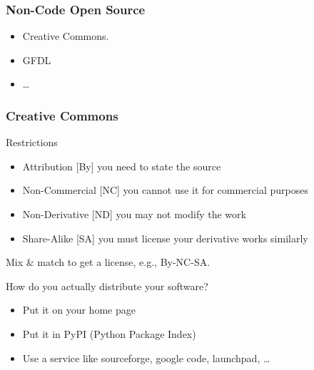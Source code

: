 \begin{frame}[fragile]
\frametitle{Non-Code Open Source}

\begin{itemize}
\item Creative Commons.
\item GFDL
\item \ldots
\end{itemize}
\end{frame}

\begin{frame}[fragile]
\frametitle{Creative Commons}

\begin{block}{Restrictions}
\begin{itemize}
\item \alert{Attribution} [By] you need to state the source
\item \alert{Non-Commercial} [NC] you cannot use it for commercial purposes
\item \alert{Non-Derivative} [ND] you may not modify the work
\item \alert{Share-Alike} [SA] you must license your derivative works similarly 
\end{itemize}
\end{block}

Mix \& match to get a license, e.g., By-NC-SA.
\end{frame}

\begin{frame}[fragile]

How do you actually distribute your software?

\begin{itemize}
\item Put it on your home page
\item Put it in PyPI (Python Package Index)
\item Use a service like \alert{sourceforge}, \alert{google code}, \alert{launchpad}, \ldots
\end{itemize}
\end{frame}

